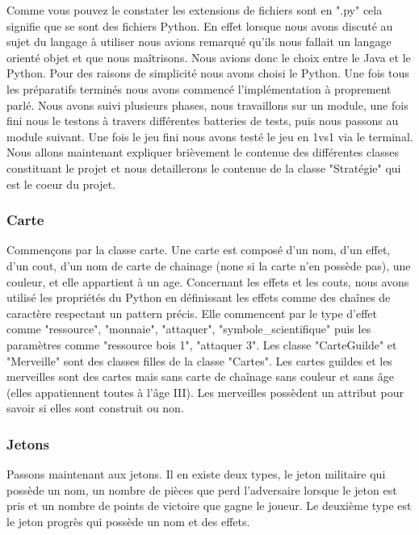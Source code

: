 \documentclass[12pt]{article}
\begin{document}
	Comme vous pouvez le constater les extensions de fichiers sont en ".py" cela signifie que se sont des fichiers Python. En effet lorsque nous avons discuté au sujet du langage à utiliser nous avions remarqué qu'ils nous fallait un langage orienté objet et que nous maîtrisons. Nous avions donc le choix entre le Java et le Python. Pour des raisons de simplicité nous avons choisi le Python. Une fois tous les préparatifs terminés nous avons commencé l'implémentation à proprement parlé. Nous avons suivi plusieurs phases, nous travaillons sur un module, une fois fini nous le testons à travers différentes batteries de tests, puis nous passons au module suivant. Une fois le jeu fini nous avons testé le jeu en 1vs1 via le terminal. Nous allons maintenant expliquer brièvement le contenue des différentes classes constituant le projet et nous detaillerons le contenue de la classe "Stratégie" qui est le coeur du projet.

	\subsubsection{Carte}
		Commençons par la classe carte.
		Une carte est composé d'un nom, d'un effet, d'un cout, d'un nom de carte de chainage (none si la carte n'en possède pas), une couleur, et elle appartient à un age.
		Concernant les effets et les couts, nous avons utilisé les propriétés du Python en définissant les effets comme des chaînes de caractère respectant un pattern précis. Elle commencent par le type d'effet comme "ressource", "monnaie", "attaquer", "symbole\_scientifique" puis les paramètres comme "ressource bois 1", "attaquer 3". Les classe "CarteGuilde" et "Merveille" sont des classes filles de la classe "Cartes". Les cartes guildes et les merveilles sont des cartes mais sans carte de chaînage sans couleur et sans âge (elles appatiennent toutes à l'âge III). Les merveilles possèdent un attribut pour savoir si elles sont construit ou non.

	\subsubsection{Jetons}
		Passons maintenant aux jetons. Il en existe deux types, le jeton militaire qui possède un nom, un nombre de pièces que perd l'adversaire lorsque le jeton est pris et un nombre de points de victoire que gagne le joueur. Le deuxième type est le jeton progrès qui possède un nom et des effets.
\end{document}

